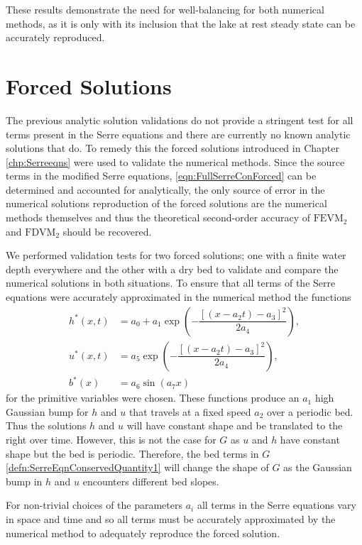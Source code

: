 These results demonstrate the need for well-balancing for both numerical methods, as it is only with its inclusion that the lake at rest steady state can be accurately reproduced. 


\section{Forced Solutions}
The previous analytic solution validations do not provide a stringent test for all terms present in the Serre equations and there are currently no known analytic solutions that do. To remedy this the forced solutions introduced in Chapter \ref{chp:Serreeqns} were used to validate the numerical methods. Since the source terms in the modified Serre equations, \eqref{eqn:FullSerreConForced} can be determined and accounted for analytically, the only source of error in the numerical solutions reproduction of the forced solutions are the numerical methods themselves and thus the theoretical second-order accuracy of $\text{FEVM}_2$ and $\text{FDVM}_2$ should be recovered. 

We performed validation tests for two forced solutions; one with a finite water depth everywhere and the other with a dry bed to validate and compare the numerical solutions in both situations. To ensure that all terms of the Serre equations were accurately approximated in the numerical method the functions
\begin{subequations}
\begin{align}
\label{eqn:ForcedSolutionxt}
h^*(x,t) &= a_0 + a_1 \exp\left(-\dfrac{\left[\left(x - a_2 t\right) - a_3\right]^2}{2 a_4}\right), \\
u^*(x,t) &= a_5 \exp\left(-\dfrac{\left[\left(x - a_2 t\right) - a_3\right]^2}{2 a_4}\right), \\
b^*(x) &= a_6 \sin\left(a_7 x\right)
\end{align}
\end{subequations}
for the primitive variables were chosen. These functions produce an $a_1$ high Gaussian bump for $h$ and $u$ that travels at a fixed speed $a_2$ over a periodic bed. Thus the solutions $h$ and $u$ will have constant shape and be translated to the right over time. However, this is not the case for $G$ as $u$ and $h$ have constant shape but the bed is periodic. Therefore, the bed terms in $G$ \eqref{defn:SerreEqnConservedQuantity1} will change the shape of $G$ as the Gaussian bump in $h$ and $u$ encounters different bed slopes.

For non-trivial choices of the parameters $a_i$ all terms in the Serre equations vary in space and time and so all terms must be accurately approximated by the numerical method to adequately reproduce the forced solution. 

